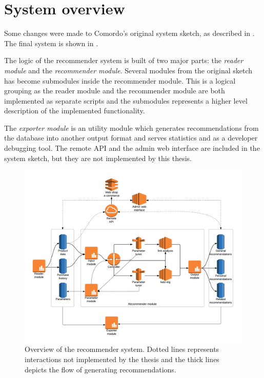 
\section{System overview}\label{sec:res:sys}

Some changes were made to Comordo's original system sketch, as described in . The final system is shown in .

The logic of the recommender system is built of two major parts: the \textit{reader module} and the \textit{recommender module}. Several modules from the original sketch has become submodules inside the recommender module. This is a logical grouping as the reader module and the recommender module are both implemented as separate scripts and the submodules represents a higher level description of the implemented functionality. 

The \textit{exporter module} is an utility module which generates recommendations from the database into another output format and serves statistics and as a developer debugging tool.  The remote API and the admin web interface are included in the system sketch, but they are not implemented by this thesis.

\begin{figure}[h!]
  \centering
    \includegraphics[width=1.0\textwidth]{fig/system_overview_final.png}
  \caption{Overview of the recommender system. Dotted lines represents interactions not implemented by the thesis and the thick lines depicts the flow of generating recommendations.}
  \label{fig:sysfinal}
\end{figure}

\FloatBarrier





